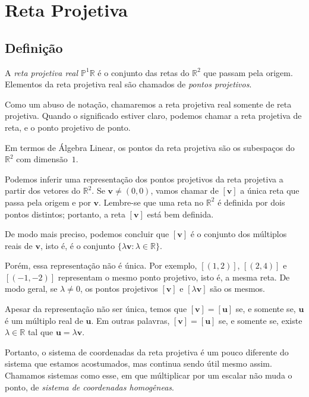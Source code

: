 \chapter{Reta Projetiva}

\section{Definição}

\begin{defn}
A \emph{reta projetiva real \(\mathbb{P}^1\mathbb{R}\)} é o conjunto das retas do \(\mathbb{R}^2\) que passam pela origem.
Elementos da reta projetiva real são chamados de \emph{pontos projetivos}.
\end{defn}

Como um abuso de notação, chamaremos a reta projetiva real somente de reta projetiva.
Quando o significado estiver claro, podemos chamar a reta projetiva de reta, e o ponto projetivo de ponto.

Em termos de Álgebra Linear, os pontos da reta projetiva são os subespaços do $\mathbb{R}^2$ com dimensão~$1$.

Podemos inferir uma representação dos pontos projetivos da reta projetiva a partir dos vetores do \(\mathbb{R}^2\).
Se \(\mathbf{v} \neq (0, 0)\), vamos chamar de \([\mathbf{v}]\) a única reta que passa pela origem e por \(\mathbf{v}\).
Lembre-se que uma reta no \(\mathbb{R}^2\) é definida por dois pontos distintos; portanto, a reta \([\mathbf{v}]\) está bem definida.

De modo mais preciso, podemos concluir que \([\mathbf{v}]\) é o conjunto dos múltiplos reais de \(\mathbf{v}\), isto é, é o conjunto \(\{ \lambda \mathbf{v} : \lambda \in \mathbb{R}\}\).

Porém, essa representação não é única.
Por exemplo, \([(1, 2)]\), \([(2, 4)]\) e \([(-1, -2)]\) representam o mesmo ponto projetivo, isto é, a mesma reta.
De modo geral, se \(\lambda \neq 0\), os pontos projetivos \([\mathbf{v}]\) e \([\lambda \mathbf{v}]\) são os mesmos.

Apesar da representação não ser única, temos que \([\mathbf{v}] = [\mathbf{u}]\) se, e somente se, \(\mathbf{u}\) é um múltiplo real de \(\mathbf{u}\).
Em outras palavras, \([\mathbf{v}] = [\mathbf{u}]\) se, e somente se, existe \(\lambda \in \mathbb{R}\) tal que \(\mathbf{u} = \lambda\mathbf{v}\).

Portanto, o sistema de coordenadas da reta projetiva é um pouco diferente do sistema que estamos acostumados, mas continua sendo útil mesmo assim. Chamamos sistemas como esse, em que múltiplicar por um escalar não muda o ponto, de \emph{sistema de coordenadas homogêneas}.

